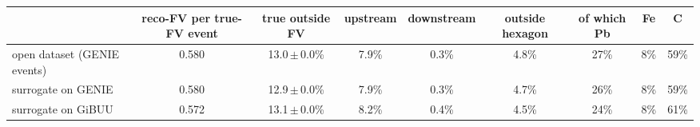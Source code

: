 \begin{tabular}{lcccccccc}
\toprule
 & reco-FV per true-FV event & true outside FV & upstream & downstream & outside hexagon & of which Pb & Fe & C \\
\midrule
open dataset (GENIE events) & 0.580 & 13.0\,$\pm$\,0.0\% & 7.9\% & 0.3\% & 4.8\% & 27\% & 8\% & 59\% \\
surrogate on GENIE & 0.580 & 12.9\,$\pm$\,0.0\% & 7.9\% & 0.3\% & 4.7\% & 26\% & 8\% & 59\% \\
surrogate on GiBUU & 0.572 & 13.1\,$\pm$\,0.0\% & 8.2\% & 0.4\% & 4.5\% & 24\% & 8\% & 61\% \\
\bottomrule
\end{tabular}
